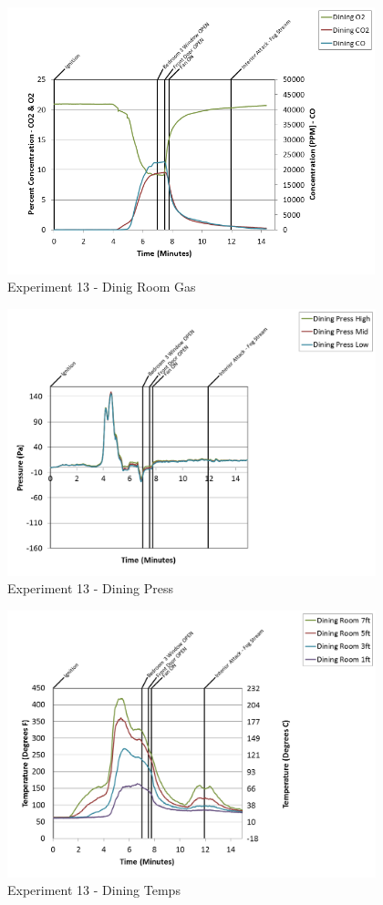 \documentclass{article}
\begin{document}
\begin{appendices}
\clearpage

\begin{figure}[h!]
	\centering
	\includegraphics[height=3.05in]{0_Images/Results_Charts/Exp_13_Charts/DinigRoomGas.png}
	\caption{Experiment 13 - Dinig Room Gas}
\end{figure}


\begin{figure}[h!]
	\centering
	\includegraphics[height=3.05in]{0_Images/Results_Charts/Exp_13_Charts/DiningPress.png}
	\caption{Experiment 13 - Dining Press}
\end{figure}

\clearpage

\begin{figure}[h!]
	\centering
	\includegraphics[height=3.05in]{0_Images/Results_Charts/Exp_13_Charts/DiningTemps.png}
	\caption{Experiment 13 - Dining Temps}
\end{figure}



\end{appendices}
\end{document}
